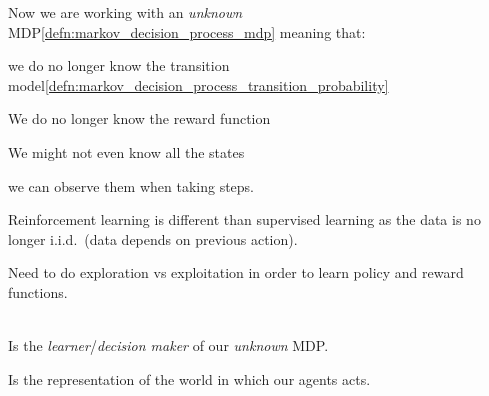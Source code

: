 \begin{sectionbox}\nospacing
  Now we are working with an \textit{unknown} MDP\cref{defn:markov_decision_process_mdp} meaning that:
  \begin{circlelistnosep}
	\item we do no longer know the transition model\cref{defn:markov_decision_process_transition_probability}
    \item We do no longer know the reward function
    \item We might not even know all the states
  \end{circlelistnosep}
   we can observe them when taking steps.
\end{sectionbox}
\begin{notebox}[Note]\nospacing
  \begin{itemizenosep}
    \item Reinforcement learning is different than supervised learning as the data is no longer i.i.d.\ (data depends on previous action).
    \item Need to do exploration vs exploitation in order to learn policy and reward functions.
  \end{itemizenosep}
\end{notebox}
\begin{defnbox}\nospacing
  \begin{defn}[Agent]\label{defn:agent}\leavevmode\\
    Is the \textit{learner}/\textit{decision maker} of our \textit{unknown} MDP.
  \end{defn}
\end{defnbox}
\begin{defnbox}\nospacing
  \begin{defn}[Environment]\label{defn:environment}
    Is the representation of the world in which our agents acts.
  \end{defn}
\end{defnbox}

